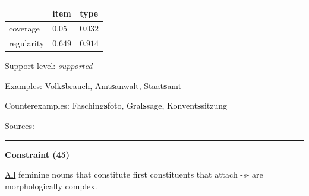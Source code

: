 \vspace{-0.35em}

\begin{table}[!ht]
\begin{center}

\begin{tabularx}{\columnwidth}{|X|X|X|}
\hline
 & item & type \\
\hline
 coverage & $0.05$ & $0.032$ \\
\hline
 regularity & $0.649$ & $0.914$ \\
\hline
\end{tabularx}
\end{center}
\end{table}

\vspace{-1.35em}

\noindent
Support level: \textit{supported}

\vspace{0.3em}

\noindent
Examples: Volk\textbf{s}brauch, Amt\textbf{s}anwalt, Staat\textbf{s}amt

\noindent
Counterexamples: Fasching\textbf{s}foto, Gral\textbf{s}sage, Konvent\textbf{s}sitzung

\vspace{0.3em}

\noindent
Sources: \citet[25]{kuerschner_2010}


\hrule




\vspace{0.4em}

\begin{center}
\textbf{Constraint (45)}
\end{center}

\noindent
\underline{All} feminine nouns that constitute first constituents that attach -\textit{s}- are morphologically complex.
\vspace{0.35em}


